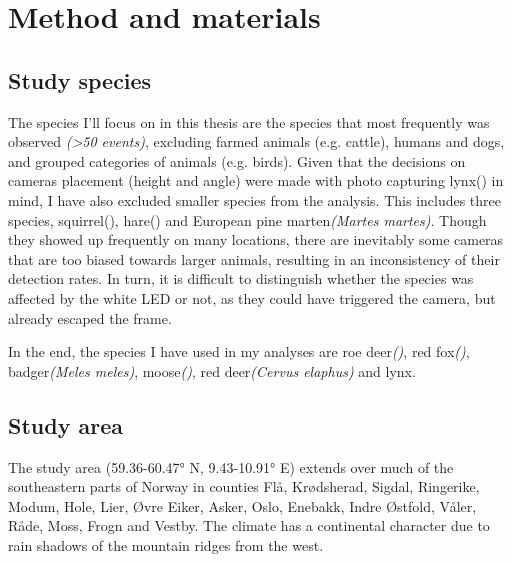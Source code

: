 \chapter{Method and materials}


\section{Study species} %


The species I'll focus on in this thesis are the species that most frequently was observed \emph{(>50 events)}, excluding farmed animals (e.g. cattle), humans and dogs, and grouped categories of animals (e.g. birds).
Given that the decisions on cameras placement (height and angle) were made with photo capturing lynx() in mind, I have also excluded smaller species from the analysis.
This includes three species, squirrel(), hare() and European pine marten\textit{(Martes martes)}. 
Though they showed up frequently on many locations, there are inevitably some cameras that are too biased towards larger animals, resulting in an inconsistency of their detection rates. 
In turn, it is difficult to distinguish whether the species was affected by the white LED or not, as they could have triggered the camera, but already escaped the frame. %

In the end, the species I have used in my analyses are roe deer\textit{()}, red fox\textit{()}, badger\textit{(Meles meles)}, moose\textit{()}, red deer\textit{(Cervus elaphus)} and lynx. 

\section{Study area} %


The study area (59.36-60.47° N, 9.43-10.91° E) %
extends over much of the southeastern parts of Norway in counties Flå, Krødsherad, Sigdal, Ringerike, Modum, Hole, Lier, Øvre Eiker, Asker, Oslo, Enebakk, Indre Østfold, Våler, Råde, Moss, Frogn and Vestby.
The climate has a continental character due to rain shadows of the mountain ridges from the west. 

